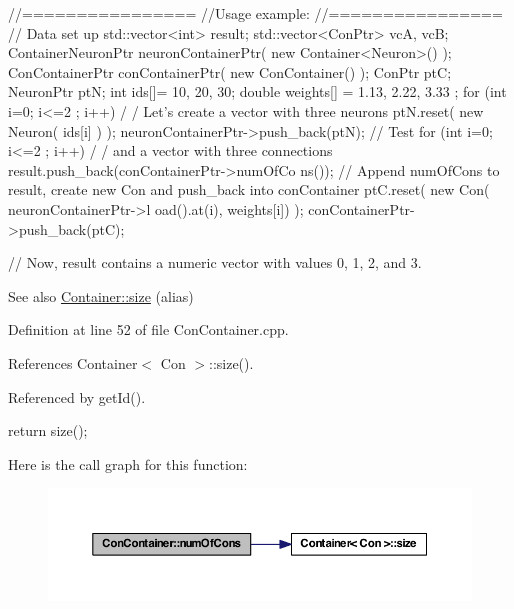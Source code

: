 \begin{DoxyCode}
  //================
  //Usage example:
  //================
        // Data set up
                                std::vector<int> result;
                                std::vector<ConPtr> vcA, vcB;
                                ContainerNeuronPtr      neuronContainerPtr( new 
      Container<Neuron>() );
                                ConContainerPtr conContainerPtr( new 
      ConContainer() );
                                ConPtr  ptC;
                                NeuronPtr ptN;
                                int ids[]= {10, 20, 30};
                                double weights[] = {1.13, 2.22, 3.33 };
                                for (int i=0; i<=2 ; i++) {                             /
      / Let's create a vector with three neurons
                                        ptN.reset( new Neuron( ids[i] ) );
                                        neuronContainerPtr->push_back(ptN);
                                }
        // Test
                                for (int i=0; i<=2 ; i++) {                             /
      / and a vector with three connections
                                        result.push_back(conContainerPtr->numOfCo
      ns());          // Append numOfCons to result, create new Con and push_back into 
      conContainer
                                        ptC.reset( new Con( neuronContainerPtr->l
      oad().at(i), weights[i]) );
                                        conContainerPtr->push_back(ptC);
                                }

        // Now, result contains a numeric vector with values 0, 1, 2, and 3.
\end{DoxyCode}


\begin{DoxySeeAlso}{See also}
\hyperlink{class_container_a359f34bc418575b474184cbe3f33527e}{Container::size} (alias) 
\end{DoxySeeAlso}


Definition at line 52 of file ConContainer.cpp.



References Container$<$ Con $>$::size().



Referenced by getId().


\begin{DoxyCode}
{
  return size();
}
\end{DoxyCode}


Here is the call graph for this function:\nopagebreak
\begin{figure}[H]
\begin{center}
\leavevmode
\includegraphics[width=376pt]{class_con_container_a8895e2c10e223e9950028f595588b9fe_cgraph}
\end{center}
\end{figure}




